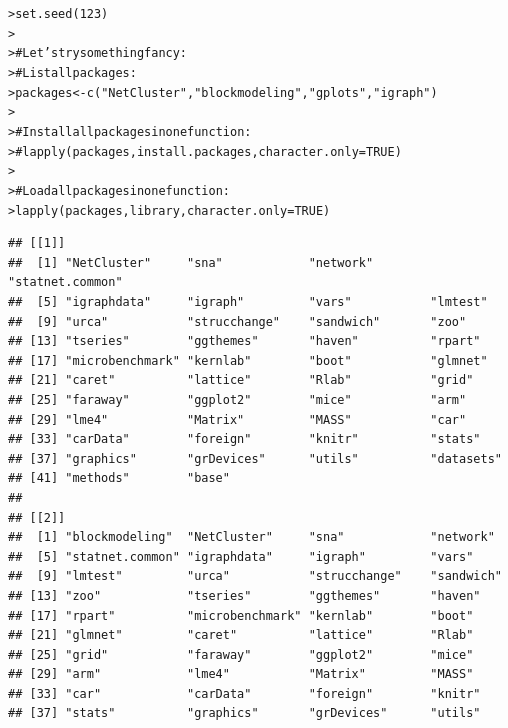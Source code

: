 \documentclass[12pt]{article}\usepackage[]{graphicx}\usepackage[]{color}
\makeatletter
\newcommand{\hlnum}[1]{\textcolor[rgb]{0.82,0.78,0.62}{#1}}%
\newcommand{\hlstr}[1]{\textcolor[rgb]{0.82,0.78,0.62}{#1}}%
\newcommand{\hlcom}[1]{\textcolor[rgb]{0.404,0.408,0.42}{#1}}%
\newcommand{\hlstd}[1]{\textcolor[rgb]{0.882,0.878,0.898}{#1}}%
\newcommand{\hlkwb}[1]{\textcolor[rgb]{0.902,0.675,0.196}{#1}}%
\newcommand{\hlkwc}[1]{\textcolor[rgb]{0.812,0.522,0.388}{#1}}%
\newcommand{\hlkwd}[1]{\textcolor[rgb]{0.733,0.388,0.812}{#1}}%
\newenvironment{kframe}{%
 \def\at@end@of@kframe{}%
 \ifinner\ifhmode%
  \def\at@end@of@kframe{\end{minipage}}%
  \begin{minipage}{\columnwidth}%
 \fi\fi%
 \def\FrameCommand##1{\hskip\@totalleftmargin \hskip-\fboxsep
 \colorbox{shadecolor}{##1}\hskip-\fboxsep
     \hskip-\linewidth \hskip-\@totalleftmargin \hskip\columnwidth}%
 \MakeFramed {\advance\hsize-\width
   \@totalleftmargin\z@ \linewidth\hsize
   \@setminipage}}%
 {\par\unskip\endMakeFramed%
 \at@end@of@kframe}
\newenvironment{knitrout}{}{} %
\makeatother
\begin{document}
\begin{flushleft}
\begin{center}
\begin{knitrout}
\color{fgcolor}\begin{kframe}
\begin{alltt}
\hlstd{> }\hlkwd{set.seed}\hlstd{(}\hlnum{123}\hlstd{)}
\hlstd{> }
\hlstd{> }\hlcom{# Let's try something fancy:}
\hlstd{> }\hlcom{# List all packages:}
\hlstd{> }\hlstd{packages} \hlkwb{<-} \hlkwd{c}\hlstd{(}\hlstr{"NetCluster"}\hlstd{,} \hlstr{"blockmodeling"}\hlstd{,} \hlstr{"gplots"}\hlstd{,} \hlstr{"igraph"}\hlstd{)}
\hlstd{> }
\hlstd{> }\hlcom{# Install all packages in one function:}
\hlstd{> }\hlcom{#   lapply(packages, install.packages, character.only = TRUE)}
\hlstd{> }
\hlstd{> }\hlcom{# Load all packages in one function:}
\hlstd{> }\hlkwd{lapply}\hlstd{(packages, library,} \hlkwc{character.only} \hlstd{=} \hlnum{TRUE}\hlstd{)}
\end{alltt}
\begin{verbatim}
## [[1]]
##  [1] "NetCluster"     "sna"            "network"        "statnet.common"
##  [5] "igraphdata"     "igraph"         "vars"           "lmtest"        
##  [9] "urca"           "strucchange"    "sandwich"       "zoo"           
## [13] "tseries"        "ggthemes"       "haven"          "rpart"         
## [17] "microbenchmark" "kernlab"        "boot"           "glmnet"        
## [21] "caret"          "lattice"        "Rlab"           "grid"          
## [25] "faraway"        "ggplot2"        "mice"           "arm"           
## [29] "lme4"           "Matrix"         "MASS"           "car"           
## [33] "carData"        "foreign"        "knitr"          "stats"         
## [37] "graphics"       "grDevices"      "utils"          "datasets"      
## [41] "methods"        "base"          
## 
## [[2]]
##  [1] "blockmodeling"  "NetCluster"     "sna"            "network"       
##  [5] "statnet.common" "igraphdata"     "igraph"         "vars"          
##  [9] "lmtest"         "urca"           "strucchange"    "sandwich"      
## [13] "zoo"            "tseries"        "ggthemes"       "haven"         
## [17] "rpart"          "microbenchmark" "kernlab"        "boot"          
## [21] "glmnet"         "caret"          "lattice"        "Rlab"          
## [25] "grid"           "faraway"        "ggplot2"        "mice"          
## [29] "arm"            "lme4"           "Matrix"         "MASS"          
## [33] "car"            "carData"        "foreign"        "knitr"         
## [37] "stats"          "graphics"       "grDevices"      "utils"         

\end{verbatim}
\end{kframe}
\end{knitrout}
\end{center}
\end{flushleft}
\end{document}
